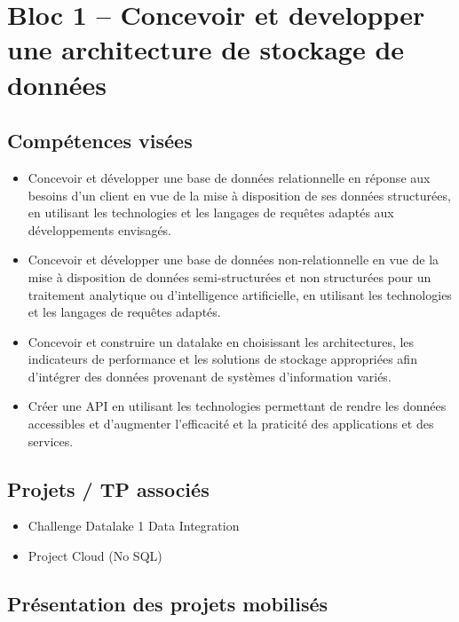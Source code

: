 \documentclass{article}
\begin{document}
\newpage
\section{Bloc 1 -- Concevoir et developper une architecture de stockage de données}

\subsection{Compétences visées}

\begin{itemize}
    \item Concevoir et développer une base de données relationnelle en réponse aux
          besoins d'un client en vue de la mise à disposition de ses données structurées,
          en utilisant les technologies et les langages de requêtes adaptés aux
          développements envisagés.
    \item Concevoir et développer une base de données non-relationnelle en vue de la
          mise à disposition de données semi-structurées et non structurées pour un
          traitement analytique ou d'intelligence artificielle, en utilisant les
          technologies et les langages de requêtes adaptés.
    \item Concevoir et construire un datalake en choisissant les architectures, les
          indicateurs de performance et les solutions de stockage appropriées afin
          d'intégrer des données provenant de systèmes d'information variés.
    \item Créer une API en utilisant les technologies permettant de rendre les données
          accessibles et d'augmenter l'efficacité et la praticité des applications et des
          services.
\end{itemize}

\subsection{Projets / TP associés}

\begin{itemize}
    \item Challenge Datalake 1 Data Integration~\cite{jobtechrepo}
    \item Project Cloud (No SQL)~\cite{projectcloudrepo}
\end{itemize}

\subsection{Présentation des projets mobilisés}
\end{document}

